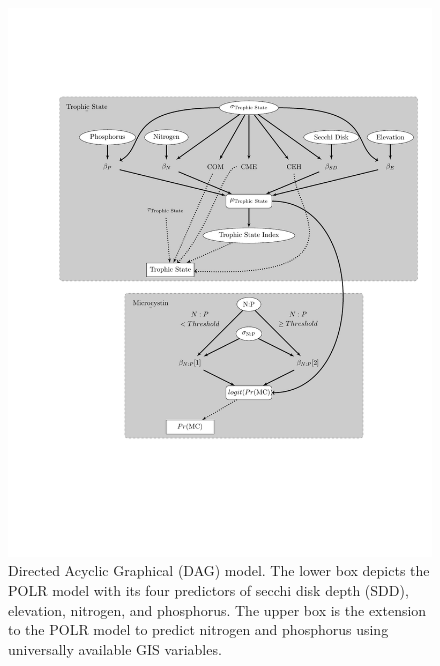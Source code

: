 \documentclass[fleqn,10pt]{wlpeerj} %
\begin{document}
\begin{figure}
  \includegraphics[page=4, scale=0.85, trim=20mm 45mm 0mm 45mm, clip]{cyanobacteria-dag-model1.pdf}
  \caption{Directed Acyclic Graphical (DAG) model. The lower box depicts the POLR model with its four predictors of secchi disk depth (SDD), elevation, nitrogen, and phosphorus. The upper box is the extension to the POLR model to predict nitrogen and phosphorus using universally available GIS variables.}
  \label{fig:DAG2}
\end{figure}
\end{document}
